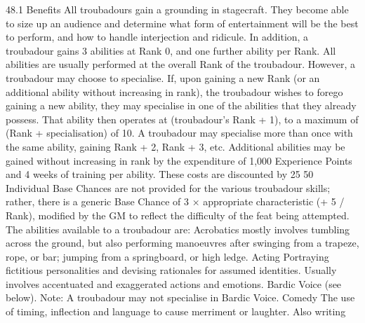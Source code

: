 \documentclass[a4paper]{article}
\begin{document}
\begin{multicols}{3}
48.1 Benefits
All troubadours gain a grounding in stagecraft.
They become able to size up an audience and determine what form of entertainment will be the best
to perform, and how to handle interjection and
ridicule.
In addition, a troubadour gains 3 abilities at Rank
0, and one further ability per Rank. All abilities are
usually performed at the overall Rank of the troubadour. However, a troubadour may choose to
specialise. If, upon gaining a new Rank (or an
additional ability without increasing in rank), the
troubadour wishes to forego gaining a new ability,
they may specialise in one of the abilities that they
already possess. That ability then operates at (troubadour’s Rank + 1), to a maximum of (Rank +
specialisation) of 10. A troubadour may specialise
more than once with the same ability, gaining Rank
+ 2, Rank + 3, etc. Additional abilities may be
gained without increasing in rank by the expenditure of 1,000 Experience Points and 4 weeks of
training per ability. These costs are discounted by
25%
50%
Individual Base Chances are not provided for the
various troubadour skills; rather, there is a generic
Base Chance of 3 × appropriate characteristic (+ 5 /
Rank), modified by the GM to reflect the difficulty
of the feat being attempted.
The abilities available to a troubadour are:
Acrobatics mostly involves tumbling across the
ground, but also performing manoeuvres after
swinging from a trapeze, rope, or bar; jumping
from a springboard, or high ledge.
Acting Portraying fictitious personalities and devising rationales for assumed identities. Usually
involves accentuated and exaggerated actions and
emotions.
Bardic Voice (see below). Note: A troubadour
may not specialise in Bardic Voice.
Comedy The use of timing, inflection and language to cause merriment or laughter. Also writing


\end{multicols}
\end{document}
